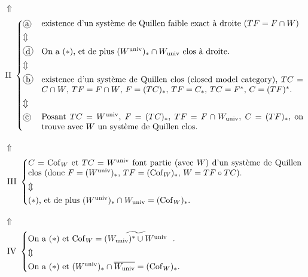 \documentclass[11pt]{article}
\newcommand{\printedpage}[1]{\marginpar{\footnotesize p.~#1}}
\newcommand{\Cof}{\mathrm{Cof}}
\newcommand{\univ}{\mathrm{univ}}
\newcommand{\cercle}[1]{\mbox{\tikz[baseline=(c.base)]\node[draw,circle,inner sep=1pt](c){#1};}}
\begin{document}
\noindent$\Uparrow$
\[
\mathrm{II}\ \left\{
\begin{array}{@{}l@{\quad}p{11cm}@{}}
\cercle{a} & existence d'un système de Quillen faible exact à droite ($TF = F \cap W$) \\[1ex]
\Updownarrow & \\[1ex]
\cercle{d} & On a $(*)$, et de plus $(W^{\univ})_* \cap W_{\univ}$ clos à droite. \\[1ex]
\Updownarrow & \\[1ex]
\cercle{b} & existence d'un système de Quillen clos (closed model category), $TC = C \cap W$, $TF = F \cap W$, $F = (TC)_*$, $TF = C_*$, $TC = F^*$, $C = (TF)^*$. \\[1ex]
\Updownarrow & \\[1ex]
\cercle{c} & Posant $TC = W^{\univ}$, $F = (TC)_*$, $TF = F \cap W_{\univ}$, $C = (TF)_*$, on trouve avec $W$ un système de Quillen clos. %
\end{array}\right.
\]

\noindent$\Uparrow$
\[
\mathrm{III}\ \left\{
\begin{array}{@{}p{11.5cm}@{}}
$C = \Cof_W$ et $TC = W^{\univ}$ font partie (avec $W$) d'un système de Quillen clos (donc $F = (W^{\univ})_*$, $TF = (\Cof_W)_*$, $W = TF \circ TC$). \\[1ex]
$\Updownarrow$ \\[1ex]
 $(*)$, et de plus $(W^{\univ})_* \cap W_{\univ} = (\Cof_W)_*$.
\end{array}\right.
\]

\noindent$\Uparrow$
\[
\mathrm{IV}\ \left\{
\begin{array}{@{}p{11.5cm}@{}}
On a $(*)$ et $\Cof_W = \widetilde{(W_{\univ})^* \cup W^{\univ}}$\ \ . \\[1ex]
$\Updownarrow$ \\[1ex]
On a $(*)$ et $(W^{\univ})_* \cap \overline{W_{\univ}} = (\Cof_W)_*$.
\end{array}\right.
\]

\clearpage
\printedpage{16}
\end{document}
